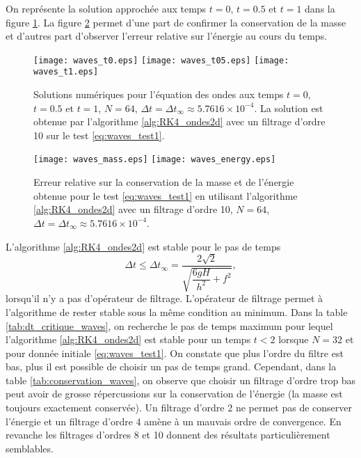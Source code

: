 On représente la solution approchée aux temps $t=0$, $t=0.5$ et $t=1$ dans la figure \ref{fig:waves_solution}. La figure \ref{fig:waves_conservation} permet d'une part de confirmer la conservation de la masse et d'autres part d'observer l'erreur relative sur l'énergie au cours du temps.
\begin{figure}[htbp]
\begin{center}
\texttt{[image: waves\_t0.eps]}
\texttt{[image: waves\_t05.eps]}
\texttt{[image: waves\_t1.eps]}
\end{center}
\caption{Solutions numériques pour l'équation des ondes aux temps $t=0$, $t=0.5$ et $t=1$, $N=64$, $\Delta t=\Delta t_{\infty} \approx 5.7616\times10^{-4}$. La solution est obtenue par l'algorithme \ref{alg:RK4_ondes2d} avec un filtrage d'ordre 10 sur le test \eqref{eq:waves_test1}.}
\label{fig:waves_solution}
\end{figure}
\begin{figure}[htbp]
\begin{center}
\texttt{[image: waves\_mass.eps]}
\texttt{[image: waves\_energy.eps]}
\end{center}
\caption{Erreur relative sur la conservation de la masse et de l'énergie obtenue pour le test \ref{eq:waves_test1} en utilisant l'algorithme \ref{alg:RK4_ondes2d} avec un filtrage d'ordre 10, $N=64$, $\Delta t=\Delta t_{\infty} \approx 5.7616\times10^{-4}$.}
\label{fig:waves_conservation}
\end{figure}
L'algorithme \ref{alg:RK4_ondes2d} est stable pour le pas de temps
\begin{equation}
\Delta t \leq \Delta t_{\infty} = \dfrac{2 \sqrt{2}}{\sqrt{\dfrac{6 g H}{h^2} + f^2}},
\end{equation}
lorsqu'il n'y a pas d'opérateur de filtrage. L'opérateur de filtrage permet à l'algorithme de rester stable sous la même condition au minimum. Dans la table \ref{tab:dt_critique_waves}, on recherche le pas de temps maximum pour lequel l'algorithme \ref{alg:RK4_ondes2d} est stable pour un temps $t<2$ lorsque $N=32$ et pour donnée initiale \eqref{eq:waves_test1}. On constate que plus l'ordre du filtre est bas, plus il est possible de choisir un pas de temps grand. Cependant, dans la table \ref{tab:conservation_waves}, on observe que choisir un filtrage d'ordre trop bas peut avoir de grosse répercussions sur la conservation de l'énergie (la masse est toujours exactement conservée). Un filtrage d'ordre 2 ne permet pas de conserver l'énergie et un filtrage d'ordre 4 amène à un mauvais ordre de convergence. En revanche les filtrages d'ordres 8 et 10 donnent des résultats particulièrement semblables.
